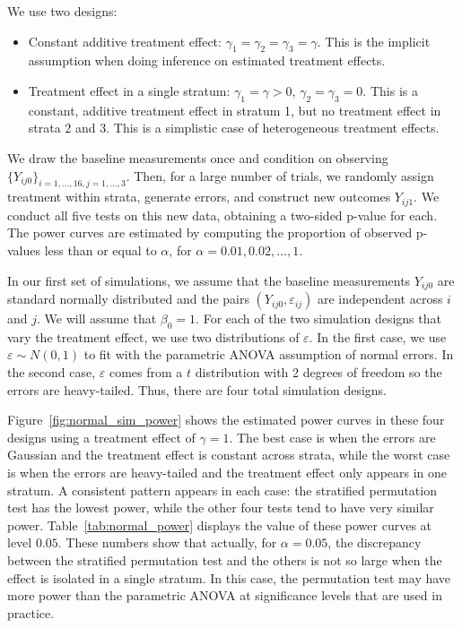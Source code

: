\documentclass[11pt]{article}
\newcommand{\todo}[1]{{\color{red}{TO DO: \sc #1}}}
\begin{document}
We use two designs:
\begin{itemize}
\item Constant additive treatment effect: $\gamma_1 = \gamma_2 = \gamma_3 = \gamma$. This is the implicit assumption when doing inference on estimated treatment effects.
\item Treatment effect in a single stratum: $\gamma_1 = \gamma > 0$, $\gamma_2 = \gamma_3 = 0$. This is a constant, additive treatment effect in stratum 1, but no treatment effect in strata 2 and 3. This is a simplistic case of heterogeneous treatment effects.
\end{itemize}

We draw the baseline measurements once and condition on observing $\{ Y_{ij0}\}_{i = 1,\dots,16, j = 1,\dots, 3}$.
Then, for a large number of trials, we randomly assign treatment within strata, generate errors, and construct new outcomes $Y_{ij1}$.
We conduct all five tests on this new data, obtaining a two-sided p-value for each.
The power curves are estimated by computing the proportion of observed p-values less than or equal to $\alpha$, for $\alpha = 0.01, 0.02, \dots, 1$.

In our first set of simulations, we assume that the baseline measurements $Y_{ij0}$ are standard normally distributed and the pairs $(Y_{ij0}, \varepsilon_{ij})$ are independent across $i$ and $j$.
We will assume that $\beta_0 = 1$.
For each of the two simulation designs that vary the treatment effect, we use two distributions of $\varepsilon$.
In the first case, we use $\varepsilon \sim N(0, 1)$ to fit with the parametric ANOVA assumption of normal errors.
In the second case, $\varepsilon$ comes from a $t$ distribution with 2 degrees of freedom so the errors are heavy-tailed.
Thus, there are four total simulation designs.

Figure~\ref{fig:normal_sim_power} shows the estimated power curves in these four designs using a treatment effect of $\gamma = 1$.
The best case is when the errors are Gaussian and the treatment effect is constant across strata, while the worst case is when the errors are heavy-tailed and the treatment effect only appears in one stratum.
\todo{it makes sense that this happens as assumptions are broken in other cases}
A consistent pattern appears in each case: the stratified permutation test has the lowest power, while the other four tests tend to have very similar power.
Table~\ref{tab:normal_power} displays the value of these power curves at level $0.05$.
These numbers show that actually, for $\alpha=0.05$, the discrepancy between the stratified permutation test and the others is not so large when the effect is isolated in a single stratum.
In this case, the permutation test may have more power than the parametric ANOVA at significance levels that are used in practice.
\end{document}
